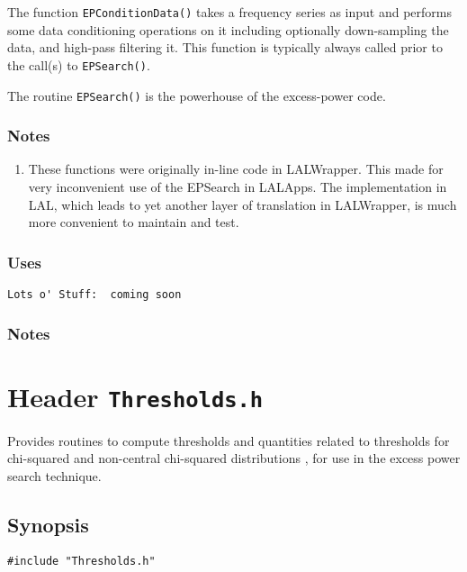 The function \texttt{EPConditionData()} takes a frequency series as input
and performs some data conditioning operations on it including optionally
down-sampling the data, and high-pass filtering it.  This function is
typically always called prior to the call(s) to \texttt{EPSearch()}.

The routine \texttt{EPSearch()} is the powerhouse of the excess-power code.


\subsubsection*{Notes}

\begin{enumerate}
\item These functions were originally in-line code in LALWrapper.  This
made for very inconvenient use of the EPSearch in LALApps.  The
implementation in LAL,  which leads to yet another layer of translation in
LALWrapper,  is much more convenient to maintain and test.
\end{enumerate}

\subsubsection*{Uses}
\begin{verbatim}
Lots o' Stuff:  coming soon
\end{verbatim}
\subsubsection*{Notes}

\vfill{\footnotesize}



%
%
%
%
%
%
%
%




\newpage
\section{Header \texttt{Thresholds.h}}
\label{s:Thresholds.h}

\noindent Provides routines to compute thresholds and quantities related to
thresholds for chi-squared and non-central chi-squared distributions
\cite{ptvf:1992}, for use in the excess power search technique.

\subsection*{Synopsis}
\begin{verbatim}
#include "Thresholds.h"
\end{verbatim}

